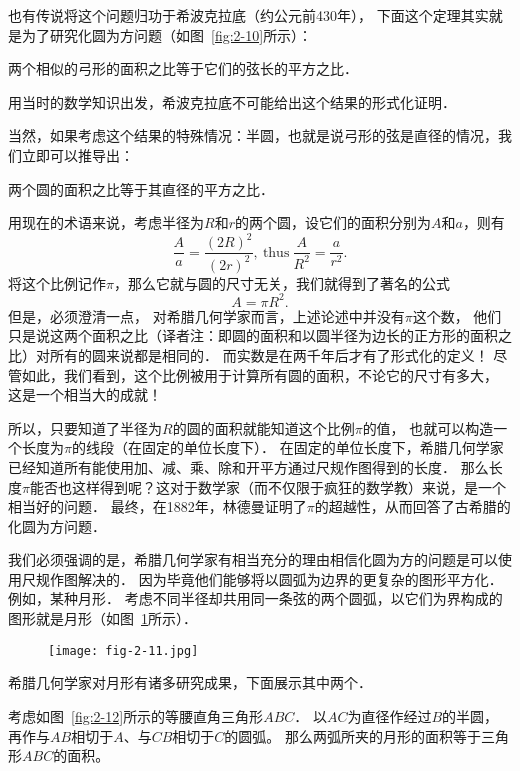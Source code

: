 \documentclass[cn,fancy,blue,11pt]{elegantbook}
\begin{document}
也有传说将这个问题归功于希波克拉底（约公元前430年），
下面这个定理其实就是为了研究化圆为方问题（如图~\ref{fig:2-10}所示）：

\begin{framed}
	两个相似的弓形的面积之比等于它们的弦长的平方之比．
\end{framed}

用当时的数学知识出发，希波克拉底不可能给出这个结果的形式化证明．

当然，如果考虑这个结果的特殊情况：半圆，也就是说弓形的弦是直径的情况，我们立即可以推导出：
\begin{framed}
	两个圆的面积之比等于其直径的平方之比．
\end{framed}
用现在的术语来说，考虑半径为$R$和$r$的两个圆，设它们的面积分别为$A$和$a$，则有
\[\frac{A}{a}=\frac{(2R)^2}{(2r)^2},~\textrm{thus}~\frac{A}{R^2}=\frac{a}{r^2}.\]
将这个比例记作$\pi$，那么它就与圆的尺寸无关，我们就得到了著名的公式
\[A=\pi R^2.\]
但是，必须澄清一点，
对希腊几何学家而言，上述论述中并没有$\pi$这个数，
他们只是说这两个面积之比（译者注：即圆的面积和以圆半径为边长的正方形的面积之比）对所有的圆来说都是相同的．
而实数是在两千年后才有了形式化的定义！
尽管如此，我们看到，这个比例被用于计算所有圆的面积，不论它的尺寸有多大，
这是一个相当大的成就！

所以，只要知道了半径为$R$的圆的面积就能知道这个比例$\pi$的值，
也就可以构造一个长度为$\pi$的线段（在固定的单位长度下）．
在固定的单位长度下，希腊几何学家已经知道所有能使用加、减、乘、除和开平方通过尺规作图得到的长度．
那么长度$\pi$能否也这样得到呢？这对于数学家（而不仅限于疯狂的数学教）来说，是一个相当好的问题．
最终，在1882年，林德曼证明了$\pi$的超越性，从而回答了古希腊的化圆为方问题．

我们必须强调的是，希腊几何学家有相当充分的理由相信化圆为方的问题是可以使用尺规作图解决的．
因为毕竟他们能够将以圆弧为边界的更复杂的图形平方化．
例如，某种月形．
考虑不同半径却共用同一条弦的两个圆弧，以它们为界构成的图形就是月形（如图~\ref{fig:2-11}所示）．
\begin{figure}[htbp]
	\centering
	\texttt{[image: fig-2-11.jpg]}
	\caption{\label{fig:2-11}}
\end{figure}
希腊几何学家对月形有诸多研究成果，下面展示其中两个．
\begin{proposition*}{}{}
	考虑如图~\ref{fig:2-12}所示的等腰直角三角形$ABC$．
	以$AC$为直径作经过$B$的半圆，
	再作与$AB$相切于$A$、与$CB$相切于$C$的圆弧。
	那么两弧所夹的月形的面积等于三角形$ABC$的面积。
\end{proposition*}
\end{document}

